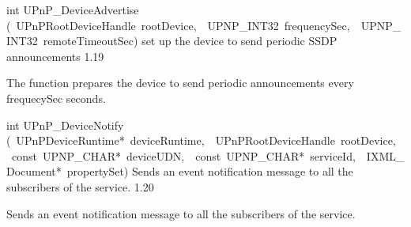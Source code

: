 \documentclass{article}
\begin{document}
\begin{cxxentry}
\begin{cxxfunction}
\begin{cxxdoc}
\end{cxxdoc}
\end{cxxfunction}
\begin{cxxfunction}
{int}
        {UPnP\_DeviceAdvertise}
        {(\ UPnPRootDeviceHandle\ rootDevice,\ \ UPNP\_INT32\ frequencySec,\ \ UPNP\_INT32\ remoteTimeoutSec)}
        {set up the device to send periodic SSDP announcements }
        {1.19}
\begin{cxxdoc}
The function prepares the device to send periodic announcements every
frequecySec seconds.

\end{cxxdoc}
\end{cxxfunction}
\begin{cxxfunction}
{int}
        {UPnP\_DeviceNotify}
        {(\ UPnPDeviceRuntime*\ deviceRuntime,\ \ UPnPRootDeviceHandle\ rootDevice,\ \ const\ UPNP\_CHAR*\ deviceUDN,\ \ const\ UPNP\_CHAR*\ serviceId,\ \ IXML\_Document*\ propertySet)}
        {Sends an event notification message to all the subscribers of the service.}
        {1.20}
\begin{cxxdoc}
Sends an event notification message to all the subscribers of the service.



\end{cxxdoc}
\end{cxxfunction}
\end{cxxentry}
\end{document}
